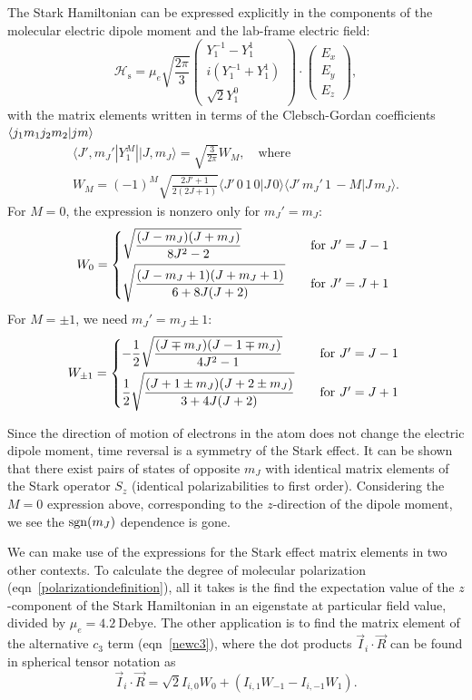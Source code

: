 The Stark Hamiltonian can be expressed explicitly in the components of the
molecular electric dipole moment and the lab-frame electric field:
%
\[
    \mathcal H_\text{s}
    =\mu_{e}\sqrt{\frac{2\pi}{3}}\begin{pmatrix}
        Y_1^{-1}-Y_1^1\\
        i(Y_1^{-1}+Y_1^1)\\
    \sqrt2Y_1^0\end{pmatrix}
    \cdot
    \begin{pmatrix}
        E_x\\E_y\\E_z
    \end{pmatrix},
\]
%
with the matrix elements written in terms of the Clebsch-Gordan coefficients
$\langle j_1m_1j_2m_2|jm\rangle$ \begin{gather*}
    \langle J',m_J'|Y_1^M||J,m_J\rangle
    =\sqrt{\frac{3}{2\pi}}W_M,\quad\text{where}\\
    W_M=(-1)^{M}
    \sqrt{\frac{2 J' + 1}{2(2 J + 1)}}
    \langle J' \, 0 \, 1 \, 0 | J \, 0 \rangle
    \langle J' \, m_J' \, 1 \, -M | J \, m_J \rangle.
\end{gather*}
%
For $M=0$, the expression is nonzero only for $m_J'=m_J$:
%
\[
    W_0=
    \begin{dcases*}
        \sqrt{\frac{(J-m_J)(J+m_J)}{8J^2-2}}&\quad for $J'=J-1$\\
        \sqrt{\frac{(J-m_J+1)(J+m_J+1)}{6+8J(J+2)}}&\quad for $J'=J+1$
    \end{dcases*}
\]
%
For $M=\pm1$, we need $m_J'=m_J\pm1$:
%
\[
    W_{\pm1}=
    \begin{dcases*}
        -\frac{1}{2}
        \sqrt{\frac{(J\mp m_J)(J-1\mp m_J)}{4J^2-1}}&\quad\text{for $J'=J-1$}\\
        \frac{1}{2}
        \sqrt{\frac{(J+1\pm m_J)(J+2\pm m_J)}{3+4J(J+2)}}&\quad\text{for $J'=J+1$}
    \end{dcases*}
\]

Since the direction of motion of electrons in the atom does not change the
electric dipole moment, time reversal is a symmetry of the Stark effect.
\cite{gottfried2013quantum} It can be shown that there exist pairs of states of
opposite $m_J$ with identical matrix elements of the Stark operator $S_z$
(identical polarizabilities to first order). \cite{angel1968hyperfine}
Considering the $M=0$ expression above, corresponding to the $z$-direction of
the dipole moment, we see the $\operatorname{sgn}(m_J)$ dependence is gone.

We can make use of the expressions for the Stark effect matrix elements in two
other contexts. To calculate the degree of molecular polarization
(eqn~\ref{polarizationdefinition}), all it takes is the find the expectation
value of the $z$-component of the Stark Hamiltonian in an eigenstate at
particular field value, divided by $\mu_e=4.2~\text{Debye}$. The other
application is to find the matrix element of the alternative $c_3$ term
(eqn~\ref{newc3}), where the dot products $\vec I_i\cdot\vec R$ can be found in
spherical tensor notation as
%
\[
    \vec I_i\cdot\vec R
    =
    \sqrt2I_{i,0}W_0+
    \left(I_{i,1}W_{-1}-I_{i,-1}W_1\right).
\]

